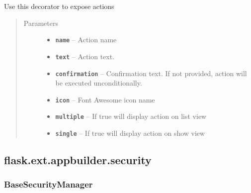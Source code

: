 \documentclass[letterpaper,10pt,english]{sphinxmanual}
\begin{document}
\begin{fulllineitems}
\label{api:flask.ext.appbuilder.actions.action}
Use this decorator to expose actions
\begin{quote}\begin{description}
\item[{Parameters}] \leavevmode\begin{itemize}
\item {} 
\textbf{\texttt{name}} -- Action name

\item {} 
\textbf{\texttt{text}} -- Action text.

\item {} 
\textbf{\texttt{confirmation}} -- Confirmation text. If not provided, action will be executed
unconditionally.

\item {} 
\textbf{\texttt{icon}} -- Font Awesome icon name

\item {} 
\textbf{\texttt{multiple}} -- If true will display action on list view

\item {} 
\textbf{\texttt{single}} -- If true will display action on show view

\end{itemize}

\end{description}\end{quote}

\end{fulllineitems}



\subsection{flask.ext.appbuilder.security}
\label{api:flask-ext-appbuilder-security}\label{api:module-flask.ext.appbuilder.security.manager}

\subsubsection{BaseSecurityManager}
\label{api:basesecuritymanager}
\end{document}

